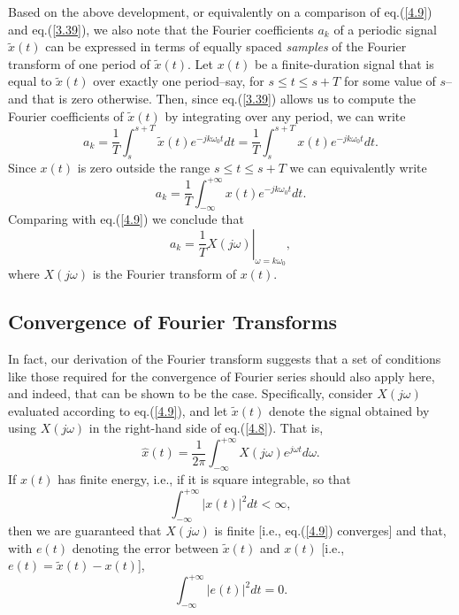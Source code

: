 \documentclass[a4paper,10pt,twoside]{book}
\begin{document}
Based on the above development, or equivalently on a comparison of eq.\;(\ref{4.9}) and eq.\;(\ref{3.39}), we also note that the Fourier coefficients $a_k$ of a periodic signal $\tilde{x}(t)$ can be expressed in terms of equally spaced \textit{samples} of the Fourier transform of one period of $\tilde{x}(t)$. Let $x(t)$ be a finite-duration signal that is equal to $\tilde{x}(t)$ over exactly one period--say, for $s\le t\le s+T$ for some value of $s$--and that is zero otherwise. Then, since eq.\;(\ref{3.39}) allows us to compute the Fourier coefficients of $\tilde{x}(t)$ by integrating over any period, we can write $$a_k = \frac1T\int_s^{s+T}\tilde{x}(t)e^{-jk\omega_0t}dt = \frac1T\int_s^{s+T}x(t)e^{-jk\omega_0t}dt.$$ Since $x(t)$ is zero outside the range $s\le t\le s+T$ we can equivalently write $$a_{k} = \frac{1}{T}\int_{-\infty}^{+\infty}x(t)e^{-jk\omega_{0}t}dt.$$ Comparing with eq.\;(\ref{4.9}) we conclude that
\begin{equation}
    a_k=\left.\frac1TX(j\omega)\right|_{\omega=k\omega_0},
    \label{4.10}
\end{equation}
where $X(j\omega)$ is the Fourier transform of $x(t)$.

\subsection{Convergence of Fourier Transforms}

In fact, our derivation of the Fourier transform suggests that a set of conditions like those required for the convergence of Fourier series should also apply here, and indeed, that can be shown to be the case. Specifically, consider $X(j\omega)$ evaluated according to eq.\;(\ref{4.9}), and let $\tilde{x}(t)$ denote the signal obtained by using $X(j\omega)$ in the right-hand side of eq.\;(\ref{4.8}). That is, $$\hat{x}(t)=\frac1{2\pi}\int_{-\infty}^{+\infty}X(j\omega)e^{j\omega t}d\omega.$$ If $x(t)$ has finite energy, i.e., if it is square integrable, so that
\begin{equation}
    \int_{-\infty}^{+\infty}|x(t)|^2dt<\infty,
    \label{4.11}
\end{equation}
then we are guaranteed that $X(j\omega)$ is finite [i.e., eq.\;(\ref{4.9}) converges] and that, with $e(t)$ denoting the error between $\tilde{x}(t)$ and $x(t)$ [i.e., $e(t)=\tilde{x}(t)-x(t)$],
\begin{equation}
    \int_{-\infty}^{+\infty}|e(t)|^2dt=0.
    \label{4.12}
\end{equation}
\end{document}
